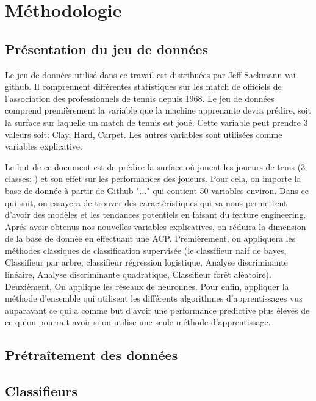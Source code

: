 \section{Méthodologie}

\subsection{Présentation du jeu de données}
Le jeu de données utilisé dans ce travail est distribuées par Jeff Sackmann vai github. Il comprennent différentes statistiques sur les match de officiels de l'association des professionnels de tennis depuis 1968. Le jeu de données comprend premièrement la variable que la machine apprenante devra prédire, soit la surface sur laquelle un match de tennis est joué. Cette variable peut prendre 3 valeurs soit: Clay, Hard, Carpet. Les autres variables sont utilisées comme variables explicative.






Le but de ce document est de prédire la surface où jouent les joueurs de tenis (3 classes: ) et son effet sur les performances des joueurs. Pour cela, on importe la base de donnée à partir de Github "..." qui contient 50 variables environ. Dans ce qui suit, on essayera de trouver des caractéristiques qui va nous permettent d'avoir des modèles et les tendances potentiels en faisant du feature engineering. Aprés avoir obtenus nos nouvelles variables explicatives, on réduira la dimension de la base de donnée en effectuant une ACP. Premièrement, on appliquera les méthodes classiques de classification supervisée (le classifieur naif de bayes, Classifieur par arbre, classifieur régression logistique, Analyse discriminante linéaire, Analyse discriminante quadratique, Classifieur forêt aléatoire). Deuxièment, On applique les réseaux de neuronnes. Pour enfin, appliquer la méthode d'ensemble qui  utilisent les différents algorithmes d'apprentissages vus auparavant ce qui a comme but d'avoir une performance predictive plus élevés de ce qu'on pourrait avoir si on utilise une seule méthode d'apprentissage.


\subsection{Prétraîtement des données}

\subsection{Classifieurs}

